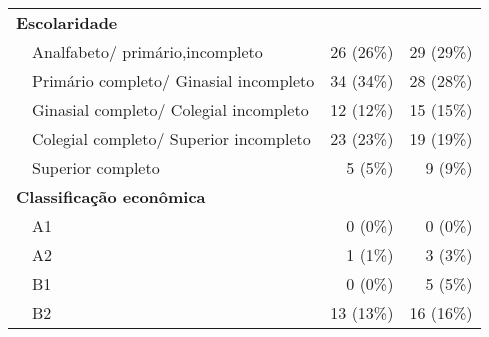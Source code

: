 \begin{table}[h!]
\begin{tabular}{llrr}
\multicolumn{4}{l}{\textbf{Escolaridade}}                                                                                                                                                                              \\
 & Analfabeto/ primário,incompleto        & 26 (26\%)                                                                              & 29 (29\%)                                                                         \\
 & Primário completo/ Ginasial incompleto & 34 (34\%)                                                                              & 28 (28\%)                                                                         \\
 & Ginasial completo/ Colegial incompleto & 12 (12\%)                                                                              & 15 (15\%)                                                                         \\
 & Colegial completo/ Superior incompleto & 23 (23\%)                                                                              & 19 (19\%)                                                                         \\
 & Superior completo                      & 5 (5\%)                                                                                & 9 (9\%)                                                                           \\ \hline
\multicolumn{4}{l}{\textbf{Classificação econômica}}                                                                                                                                                                   \\
 & A1                                     & 0 (0\%)                                                                                & 0 (0\%)                                                                           \\
 & A2                                     & 1 (1\%)                                                                                & 3 (3\%)                                                                           \\
 & B1                                     & 0 (0\%)                                                                                & 5 (5\%)                                                                           \\
 & B2                                     & 13 (13\%)                                                                              & 16 (16\%)                                                                         \\

\end{tabular}
\end{table}
